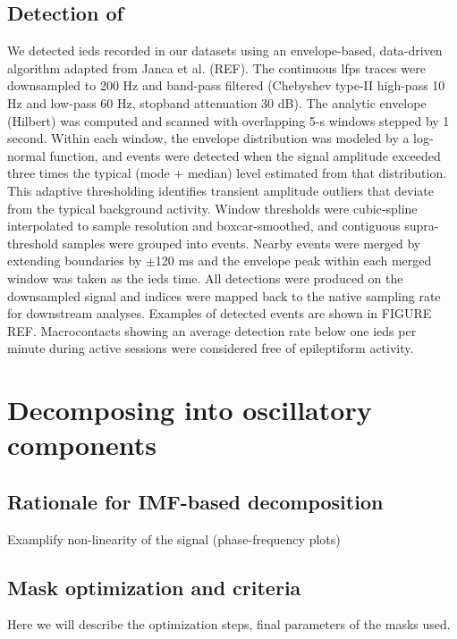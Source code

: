 \documentclass[12pt,a4paper]{report}
\newcommand{\gsp}[1]{\glsentryshortpl{#1}}  %
\newcommand{\gp}[1]{\glspl{#1}}  %
\begin{document}
\subsection{Detection of \gsp{ied}}
We detected \gp{ied} recorded in our datasets using an envelope-based, data-driven algorithm adapted from Janca et al. (REF). The continuous \gp{lfp} traces were downsampled to 200 Hz and band-pass filtered (Chebyshev type-II high-pass 10 Hz and low-pass 60 Hz, stopband attenuation 30 dB). The analytic envelope (Hilbert) was computed and scanned with overlapping 5-s windows stepped by 1 second. Within each window, the envelope distribution was modeled by a log-normal function, and events were detected when the signal amplitude exceeded three times the typical (mode + median) level estimated from that distribution. This adaptive thresholding identifies transient amplitude outliers that deviate from the typical background activity. Window thresholds were cubic-spline interpolated to sample resolution and boxcar-smoothed, and contiguous supra-threshold samples were grouped into events. Nearby events were merged by extending boundaries by $\pm$120 ms and the envelope peak within each merged window was taken as the \gp{ied} time. All detections were produced on the downsampled signal and indices were mapped back to the native sampling rate for downstream analyses. Examples of detected events are shown in FIGURE REF. Macrocontacts showing an average detection rate below one \gp{ied} per minute during active sessions were considered free of epileptiform activity. 

\section{Decomposing \gsp{lfp} into oscillatory components}
\label{apdx:decompositions}

\subsection{Rationale for IMF-based decomposition}
Examplify non-linearity of the signal (phase-frequency plots)

\subsection{Mask optimization and criteria}
Here we will describe the optimization steps, final parameters of the masks used. 
\end{document}
